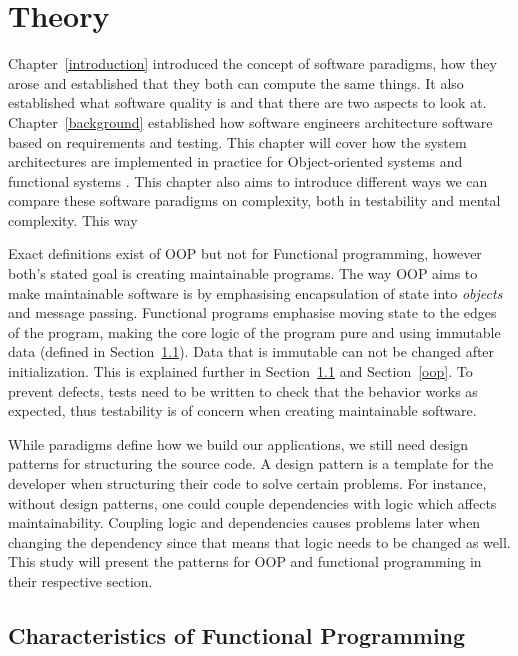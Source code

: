 \chapter{Theory}\label{theory} 

Chapter~\ref{introduction} introduced the concept of software paradigms, how
they arose and established that they both can compute the same things. It also
established what software quality is and that there are two aspects to look at.
Chapter~\ref{background} established how software engineers architecture
software based on requirements and testing. This chapter will cover how the
system architectures are implemented in practice for Object-oriented systems and
functional systems . This chapter also aims to introduce different ways we can
compare these software paradigms on complexity, both in testability and mental
complexity. This way 

Exact definitions exist of OOP but not for Functional programming, however
both's stated goal is creating maintainable programs.  The way OOP aims to make
maintainable software is by emphasising encapsulation of state into
\textit{objects} and message passing. Functional programs emphasise moving state
to the edges of the program, making the core logic of the program pure and using
immutable data (defined in Section~\ref{functionalprogramming}). Data that is
immutable can not be changed after initialization. This is explained further in
Section~\ref{functionalprogramming} and Section~\ref{oop}. To prevent defects,
tests need to be written to check that the behavior works as expected, thus
testability is of concern when creating maintainable software.

While paradigms define how we build our applications, we still need design
patterns for structuring the source code. A design pattern is a template for the
developer when structuring their code to solve certain problems. For instance,
without design patterns, one could couple dependencies with logic which affects
maintainability. Coupling logic and dependencies causes problems later when
changing the dependency since that means that logic needs to be changed as well.
This study will present the patterns for OOP and functional programming in their
respective section. 

\section{Characteristics of Functional Programming}\label{functionalprogramming}

